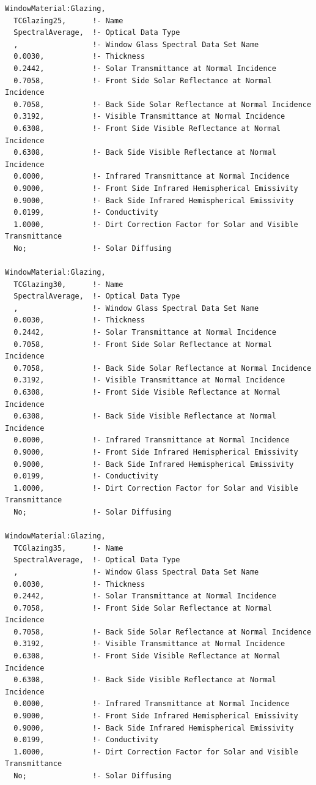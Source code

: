 \begin{lstlisting}
WindowMaterial:Glazing,
  TCGlazing25,      !- Name
  SpectralAverage,  !- Optical Data Type
  ,                 !- Window Glass Spectral Data Set Name
  0.0030,           !- Thickness
  0.2442,           !- Solar Transmittance at Normal Incidence
  0.7058,           !- Front Side Solar Reflectance at Normal Incidence
  0.7058,           !- Back Side Solar Reflectance at Normal Incidence
  0.3192,           !- Visible Transmittance at Normal Incidence
  0.6308,           !- Front Side Visible Reflectance at Normal Incidence
  0.6308,           !- Back Side Visible Reflectance at Normal Incidence
  0.0000,           !- Infrared Transmittance at Normal Incidence
  0.9000,           !- Front Side Infrared Hemispherical Emissivity
  0.9000,           !- Back Side Infrared Hemispherical Emissivity
  0.0199,           !- Conductivity
  1.0000,           !- Dirt Correction Factor for Solar and Visible Transmittance
  No;               !- Solar Diffusing

WindowMaterial:Glazing,
  TCGlazing30,      !- Name
  SpectralAverage,  !- Optical Data Type
  ,                 !- Window Glass Spectral Data Set Name
  0.0030,           !- Thickness
  0.2442,           !- Solar Transmittance at Normal Incidence
  0.7058,           !- Front Side Solar Reflectance at Normal Incidence
  0.7058,           !- Back Side Solar Reflectance at Normal Incidence
  0.3192,           !- Visible Transmittance at Normal Incidence
  0.6308,           !- Front Side Visible Reflectance at Normal Incidence
  0.6308,           !- Back Side Visible Reflectance at Normal Incidence
  0.0000,           !- Infrared Transmittance at Normal Incidence
  0.9000,           !- Front Side Infrared Hemispherical Emissivity
  0.9000,           !- Back Side Infrared Hemispherical Emissivity
  0.0199,           !- Conductivity
  1.0000,           !- Dirt Correction Factor for Solar and Visible Transmittance
  No;               !- Solar Diffusing

WindowMaterial:Glazing,
  TCGlazing35,      !- Name
  SpectralAverage,  !- Optical Data Type
  ,                 !- Window Glass Spectral Data Set Name
  0.0030,           !- Thickness
  0.2442,           !- Solar Transmittance at Normal Incidence
  0.7058,           !- Front Side Solar Reflectance at Normal Incidence
  0.7058,           !- Back Side Solar Reflectance at Normal Incidence
  0.3192,           !- Visible Transmittance at Normal Incidence
  0.6308,           !- Front Side Visible Reflectance at Normal Incidence
  0.6308,           !- Back Side Visible Reflectance at Normal Incidence
  0.0000,           !- Infrared Transmittance at Normal Incidence
  0.9000,           !- Front Side Infrared Hemispherical Emissivity
  0.9000,           !- Back Side Infrared Hemispherical Emissivity
  0.0199,           !- Conductivity
  1.0000,           !- Dirt Correction Factor for Solar and Visible Transmittance
  No;               !- Solar Diffusing


\end{lstlisting}
